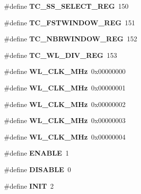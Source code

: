 \begin{DoxyCompactItemize}
\item 
\mbox{\label{_t_a_r_g_e_t_c___register_map_8h_adf5fbd0fcd4a6c3303b2f2102eac7ae1}} 
\#define {\bfseries T\+C\+\_\+\+S\+S\+\_\+\+S\+E\+L\+E\+C\+T\+\_\+\+R\+EG}~150
\item 
\mbox{\label{_t_a_r_g_e_t_c___register_map_8h_a28fad39d9c8a3c759f3abf9dc9107bd7}} 
\#define {\bfseries T\+C\+\_\+\+F\+S\+T\+W\+I\+N\+D\+O\+W\+\_\+\+R\+EG}~151
\item 
\mbox{\label{_t_a_r_g_e_t_c___register_map_8h_a6ca907085d9165322955478f133bb97e}} 
\#define {\bfseries T\+C\+\_\+\+N\+B\+R\+W\+I\+N\+D\+O\+W\+\_\+\+R\+EG}~152
\item 
\mbox{\label{_t_a_r_g_e_t_c___register_map_8h_a6a5d202751ca8e86fa26467b76453355}} 
\#define {\bfseries T\+C\+\_\+\+W\+L\+\_\+\+D\+I\+V\+\_\+\+R\+EG}~153
\item 
\mbox{\label{_t_a_r_g_e_t_c___register_map_8h_a4097d84f1a9c2567afbc92a8e8c335d9}} 
\#define {\bfseries W\+L\+\_\+\+C\+L\+K\+\_\+M\+Hz}~0x00000000
\item 
\mbox{\label{_t_a_r_g_e_t_c___register_map_8h_ab142306c6df439b10d0d386f5a8b3b6c}} 
\#define {\bfseries W\+L\+\_\+\+C\+L\+K\+\_\+M\+Hz}~0x00000001
\item 
\mbox{\label{_t_a_r_g_e_t_c___register_map_8h_afa76689fd945c4bbf92e0cd3c3abb742}} 
\#define {\bfseries W\+L\+\_\+\+C\+L\+K\+\_\+M\+Hz}~0x00000002
\item 
\mbox{\label{_t_a_r_g_e_t_c___register_map_8h_a4f2d3d569932b5d9effb3ad14a21d3df}} 
\#define {\bfseries W\+L\+\_\+\+C\+L\+K\+\_\+M\+Hz}~0x00000003
\item 
\mbox{\label{_t_a_r_g_e_t_c___register_map_8h_ae77aadd19ba5d7fe3b4402a30cb31e06}} 
\#define {\bfseries W\+L\+\_\+\+C\+L\+K\+\_\+M\+Hz}~0x00000004
\item 
\#define \textbf{ E\+N\+A\+B\+LE}~1
\item 
\mbox{\label{_t_a_r_g_e_t_c___register_map_8h_a99496f7308834e8b220f7894efa0b6ab}} 
\#define {\bfseries D\+I\+S\+A\+B\+LE}~0
\item 
\mbox{\label{_t_a_r_g_e_t_c___register_map_8h_ab5889105dcd019008c9448dff61323f6}} 
\#define {\bfseries I\+N\+IT}~2
\end{DoxyCompactItemize}
